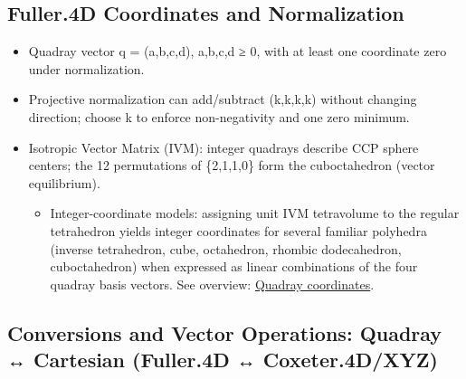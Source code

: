 \documentclass[
  10pt,
]{article}
\providecommand{\tightlist}{%
  \setlength{\itemsep}{0pt}\setlength{\parskip}{0pt}}
\begin{document}
\hypertarget{fuller.4d-coordinates-and-normalization}{%
\subsection{Fuller.4D Coordinates and
Normalization}\label{fuller.4d-coordinates-and-normalization}}

\begin{itemize}
\tightlist
\item
  Quadray vector q = (a,b,c,d), a,b,c,d ≥ 0, with at least one
  coordinate zero under normalization.
\item
  Projective normalization can add/subtract (k,k,k,k) without changing
  direction; choose k to enforce non-negativity and one zero minimum.
\item
  Isotropic Vector Matrix (IVM): integer quadrays describe CCP sphere
  centers; the 12 permutations of \{2,1,1,0\} form the cuboctahedron
  (vector equilibrium).

  \begin{itemize}
  \tightlist
  \item
    Integer-coordinate models: assigning unit IVM tetravolume to the
    regular tetrahedron yields integer coordinates for several familiar
    polyhedra (inverse tetrahedron, cube, octahedron, rhombic
    dodecahedron, cuboctahedron) when expressed as linear combinations
    of the four quadray basis vectors. See overview:
    \href{https://en.wikipedia.org/wiki/Quadray_coordinates}{Quadray
    coordinates}.
  \end{itemize}
\end{itemize}

\hypertarget{conversions-and-vector-operations-quadray-cartesian-fuller.4d-coxeter.4dxyz}{%
\subsection{Conversions and Vector Operations: Quadray ↔ Cartesian
(Fuller.4D ↔
Coxeter.4D/XYZ)}\label{conversions-and-vector-operations-quadray-cartesian-fuller.4d-coxeter.4dxyz}}
\end{document}
